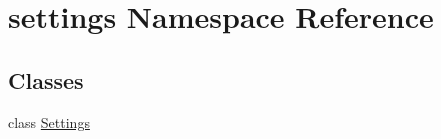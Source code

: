 \hypertarget{namespacesettings}{\section{settings \-Namespace \-Reference}
\label{namespacesettings}
}
\subsection*{\-Classes}
\begin{DoxyCompactItemize}
\item 
class \hyperlink{classsettings_1_1_settings}{\-Settings}
\end{DoxyCompactItemize}
